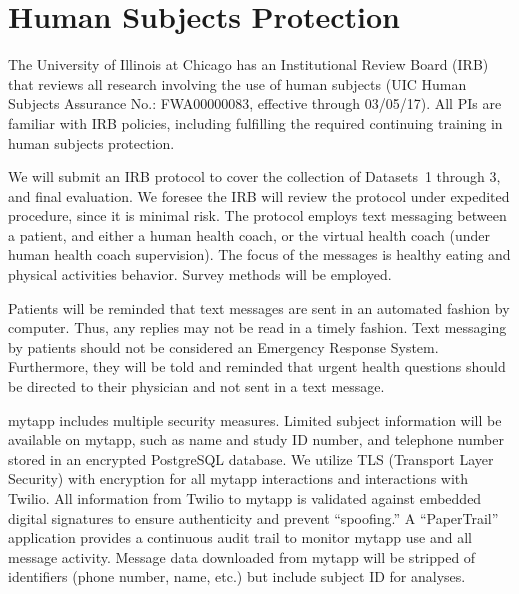 \section*{Human Subjects Protection}

The University of Illinois at Chicago has an Institutional Review Board (IRB) that reviews all
research involving the use of human subjects
(UIC Human Subjects Assurance No.: FWA00000083, effective
through 03/05/17). 
All PIs are familiar with IRB policies, including
fulfilling the required continuing  training  in human subjects protection. 




We will submit an IRB protocol to cover the collection of Datasets~1 through 3, and final evaluation.  We foresee the IRB will review the  protocol
under expedited procedure, since it is minimal risk. The protocol employs text messaging between a patient, and either a human health coach, or  the virtual health coach (under human health coach supervision). The focus of the messages is healthy eating and physical activities behavior.  Survey methods will be employed.

Patients will be reminded that text messages are sent in an automated fashion by computer. Thus, any replies may not be read in a timely fashion. Text messaging by patients should not be considered an Emergency Response System. Furthermore, they will be told and reminded that urgent health questions should be directed to their physician and not sent in a text message.

mytapp includes multiple security measures. Limited subject information will be available on mytapp, such as name and study ID number, and telephone number stored in an encrypted PostgreSQL database. We utilize TLS (Transport Layer Security) with encryption for all mytapp interactions and interactions with Twilio. All information from Twilio to mytapp is validated against embedded digital signatures to ensure authenticity and prevent “spoofing.” A “PaperTrail” application provides a continuous audit trail to monitor mytapp use and all message activity. Message data downloaded from mytapp will be stripped of identifiers (phone number, name, etc.) but include subject ID for analyses.

